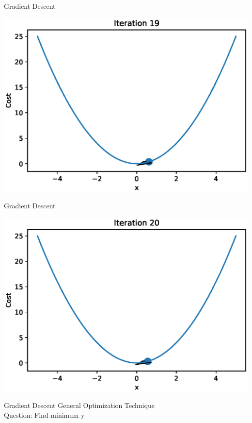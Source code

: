 \documentclass{beamer}
\begin{document}
\begin{frame}{Gradient Descent}
  \begin{center}
       \includegraphics[totalheight=6cm]{gradient-descent/iteration-19.eps}
   \end{center}
\end{frame}

\begin{frame}{Gradient Descent}
  \begin{center}
       \includegraphics[totalheight=6cm]{gradient-descent/iteration-20.eps}
   \end{center}
\end{frame}



\begin{frame}{Gradient Descent}
    General Optimization Technique\\
    Question: Find minimum y
\end{frame}
\end{document}
